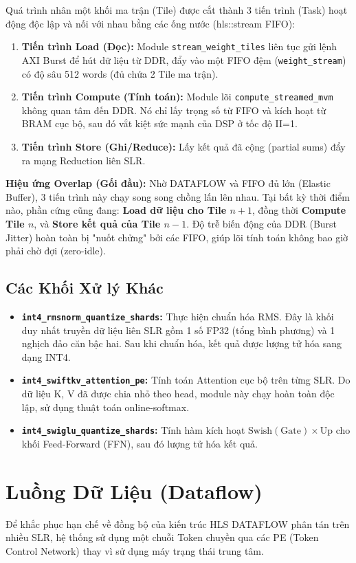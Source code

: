 \documentclass[12pt,a4paper]{article}
\begin{document}
Quá trình nhân một khối ma trận (Tile) được cắt thành 3 tiến trình (Task) hoạt động độc lập và nối với nhau bằng các ống nước (hls::stream FIFO):
\begin{enumerate}
    \item \textbf{Tiến trình Load (Đọc):} Module \texttt{stream\_weight\_tiles} liên tục gửi lệnh AXI Burst để hút dữ liệu từ DDR, đẩy vào một FIFO đệm (\texttt{weight\_stream}) có độ sâu 512 words (đủ chứa 2 Tile ma trận).
    \item \textbf{Tiến trình Compute (Tính toán):} Module lõi \texttt{compute\_streamed\_mvm} không quan tâm đến DDR. Nó chỉ lấy trọng số từ FIFO và kích hoạt từ BRAM cục bộ, sau đó vắt kiệt sức mạnh của DSP ở tốc độ II=1.
    \item \textbf{Tiến trình Store (Ghi/Reduce):} Lấy kết quả đã cộng (partial sums) đẩy ra mạng Reduction liên SLR.
\end{enumerate}

\textbf{Hiệu ứng Overlap (Gối đầu):} Nhờ DATAFLOW và FIFO đủ lớn (Elastic Buffer), 3 tiến trình này chạy song song chồng lấn lên nhau. Tại bất kỳ thời điểm nào, phần cứng cũng đang: \textbf{Load dữ liệu cho Tile $n+1$}, đồng thời \textbf{Compute Tile $n$}, và \textbf{Store kết quả của Tile $n-1$}. Độ trễ biến động của DDR (Burst Jitter) hoàn toàn bị "nuốt chửng" bởi các FIFO, giúp lõi tính toán không bao giờ phải chờ đợi (zero-idle).

\subsection{Các Khối Xử lý Khác}
\begin{itemize}
    \item \textbf{\texttt{int4\_rmsnorm\_quantize\_shards}:} Thực hiện chuẩn hóa RMS. Đây là khối duy nhất truyền dữ liệu liên SLR gồm 1 số FP32 (tổng bình phương) và 1 nghịch đảo căn bậc hai. Sau khi chuẩn hóa, kết quả được lượng tử hóa sang dạng INT4.
    \item \textbf{\texttt{int4\_swiftkv\_attention\_pe}:} Tính toán Attention cục bộ trên từng SLR. Do dữ liệu K, V đã được chia nhỏ theo head, module này chạy hoàn toàn độc lập, sử dụng thuật toán online-softmax.
    \item \textbf{\texttt{int4\_swiglu\_quantize\_shards}:} Tính hàm kích hoạt $\text{Swish}(\text{Gate}) \times \text{Up}$ cho khối Feed-Forward (FFN), sau đó lượng tử hóa kết quả.
\end{itemize}

\section{Luồng Dữ Liệu (Dataflow)}
Để khắc phục hạn chế về đồng bộ của kiến trúc HLS DATAFLOW phân tán trên nhiều SLR, hệ thống sử dụng một chuỗi Token chuyền qua các PE (Token Control Network) thay vì sử dụng máy trạng thái trung tâm.
\end{document}
